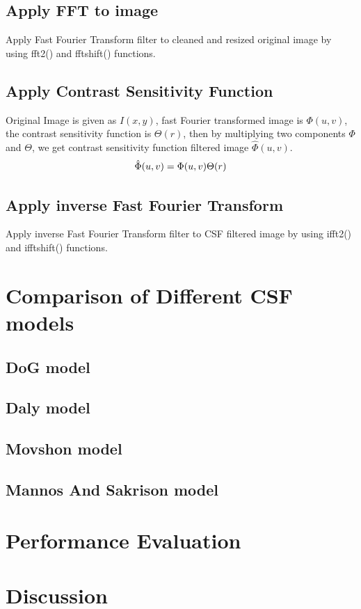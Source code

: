 \documentclass{article}
\begin{document}
\subsection{Apply FFT to image}
Apply Fast Fourier Transform filter to cleaned and resized original image by using fft2() and fftshift() functions.

\subsection{Apply Contrast Sensitivity Function}
Original Image is given as $I(x,y)$, fast Fourier transformed image is $\Phi(u,v)$, the contrast sensitivity function is $\Theta(r)$, then by multiplying two components $\Phi$ and $\Theta$, we get contrast sensitivity function filtered image $\hat{\Phi}(u,v)$.
\begin{equation}
    \centering
    \label{eq:applyCSF}
    \hat{\Phi}(u,v) = \Phi(u,v)\Theta(r) 
\end{equation}
\subsection{Apply inverse Fast Fourier Transform}
Apply inverse Fast Fourier Transform filter to CSF filtered image by using ifft2() and ifftshift() functions.

\section{Comparison of Different CSF models}
\subsection{DoG model}
\subsection{Daly model}
\subsection{Movshon model}
\subsection{Mannos And Sakrison model}
\section{Performance Evaluation}
\section{Discussion}
\end{document}
